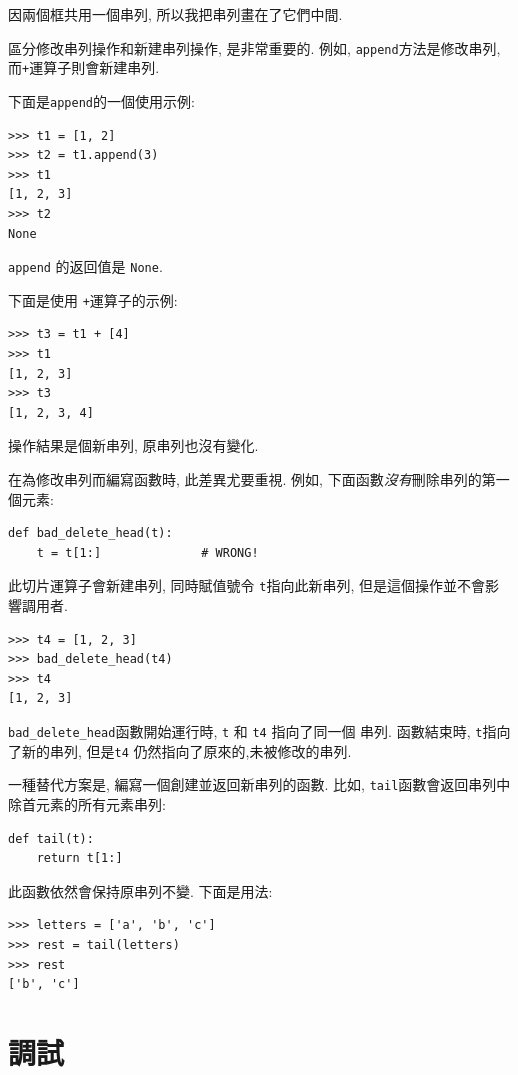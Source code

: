 \documentclass[10pt]{book}
\begin{document}
因兩個框共用一個串列, 所以我把串列畫在了它們中間. 

區分修改串列操作和新建串列操作, 是非常重要的. 
例如,  {\tt append}方法是修改串列, 而{\tt +}運算子則會新建串列.

下面是{\tt append}的一個使用示例:
%
\begin{verbatim}
>>> t1 = [1, 2]
>>> t2 = t1.append(3)
>>> t1
[1, 2, 3]
>>> t2
None
\end{verbatim}
%
{\tt append} 的返回值是 {\tt None}.

下面是使用 {\tt +}運算子的示例:
%
\begin{verbatim}
>>> t3 = t1 + [4]
>>> t1
[1, 2, 3]
>>> t3
[1, 2, 3, 4]
\end{verbatim}
%
操作結果是個新串列, 原串列也沒有變化.

在為修改串列而編寫函數時, 此差異尤要重視. 
例如, 下面函數{\em 沒有}刪除串列的第一個元素:
%
\begin{verbatim}
def bad_delete_head(t):
    t = t[1:]              # WRONG!
\end{verbatim}
%
此切片運算子會新建串列, 同時賦值號令 {\tt t}指向此新串列, 
但是這個操作並不會影響調用者.
%
\begin{verbatim}
>>> t4 = [1, 2, 3]
>>> bad_delete_head(t4)
>>> t4
[1, 2, 3]
\end{verbatim}
%

\verb"bad_delete_head"函數開始運行時, {\tt t} 和 {\tt t4} 指向了同一個
串列. 函數結束時, {\tt t}指向了新的串列, 
但是{\tt t4} 仍然指向了原來的,未被修改的串列.

一種替代方案是, 編寫一個創建並返回新串列的函數. 比如, 
{\tt tail}函數會返回串列中除首元素的所有元素串列:

\begin{verbatim}
def tail(t):
    return t[1:]
\end{verbatim}
%
此函數依然會保持原串列不變. 下面是用法:

\begin{verbatim}
>>> letters = ['a', 'b', 'c']
>>> rest = tail(letters)
>>> rest
['b', 'c']
\end{verbatim}



\section{調試}
\end{document}
